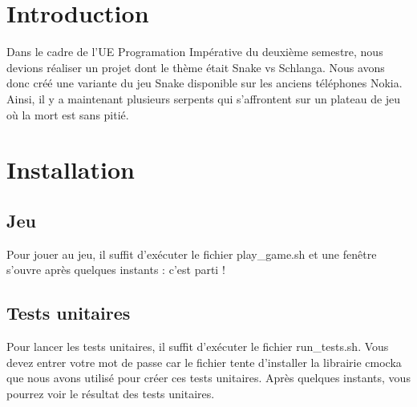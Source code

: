 \hypertarget{index_intro_sec}{}\section{Introduction}\label{index_intro_sec}
Dans le cadre de l'U\-E Programation Impérative du deuxième semestre, nous devions réaliser un projet dont le thème était Snake vs Schlanga. Nous avons donc créé une variante du jeu Snake disponible sur les anciens téléphones Nokia. Ainsi, il y a maintenant plusieurs serpents qui s'affrontent sur un plateau de jeu où la mort est sans pitié.

\par
 \hypertarget{index_install_sec}{}\section{Installation}\label{index_install_sec}
\hypertarget{index_step1}{}\subsection{Jeu}\label{index_step1}
Pour jouer au jeu, il suffit d'exécuter le fichier play\-\_\-game.\-sh et une fenêtre s'ouvre après quelques instants \-: c'est parti !\hypertarget{index_step2}{}\subsection{Tests unitaires}\label{index_step2}
Pour lancer les tests unitaires, il suffit d'exécuter le fichier run\-\_\-tests.\-sh. Vous devez entrer votre mot de passe car le fichier tente d'installer la librairie cmocka que nous avons utilisé pour créer ces tests unitaires. Après quelques instants, vous pourrez voir le résultat des tests unitaires.

